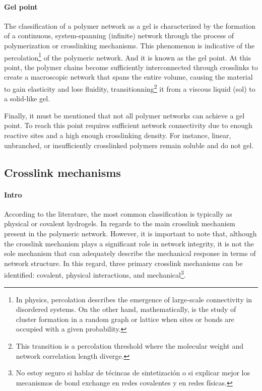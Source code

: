 \paragraph{Gel point} The classification of a polymer network as a gel is characterized by the formation of a continuous, system-spanning (infinite) network through the process of polymerization or crosslinking mechanisms.
This phenomenon is indicative of the percolation\footnote{In physics, percolation describes the emergence of large-scale connectivity in disordered systems. On the other hand, mathematically, is the study of cluster formation in a random graph or lattice when sites or bonds are occupied with a given probability.} of the polymeric network.
And it is known as the gel point\citep{guPolymerNetworksPlastics2020}.
At this point, the polymer chains become sufficiently interconnected through crosslinks to create a macroscopic network that spans the entire volume, causing the material to gain elasticity and lose fluidity, transitionning\footnote{This transition is a percolation threshold where the molecular weight and network correlation length diverge.} it from a viscous liquid (sol) to a solid-like gel.

Finally, it must be mentioned that not all polymer networks can achieve a gel point.
To reach this point requires sufficient network connectivity due to enough reactive sites and a high enough crosslinking density.
For instance, linear, unbranched, or insufficiently crosslinked polymers remain soluble and do not gel.

\subsection{Crosslink mechanisms}

\paragraph{Intro} According to the literature, the most common classification is typically as physical or covalent hydrogels.
In regards to the main crosslink mechanism present in the polymeric network.
However, it is important to note that, although the crosslink mechanism plays a significant role in network integrity, it is not the sole mechanism that can adequately describe the mechanical response in terms of network structure.
In this regard, three primary crosslink mechanisms can be identified: covalent, physical interactions, and mechanical\footnote{No estoy seguro si hablar de técincas de sintetización o si explicar mejor los mecanismos de bond exchange en redes covalentes y en redes físicas.}\citep{bustamantetorresHydrogelsClassificationAccording2021}.

